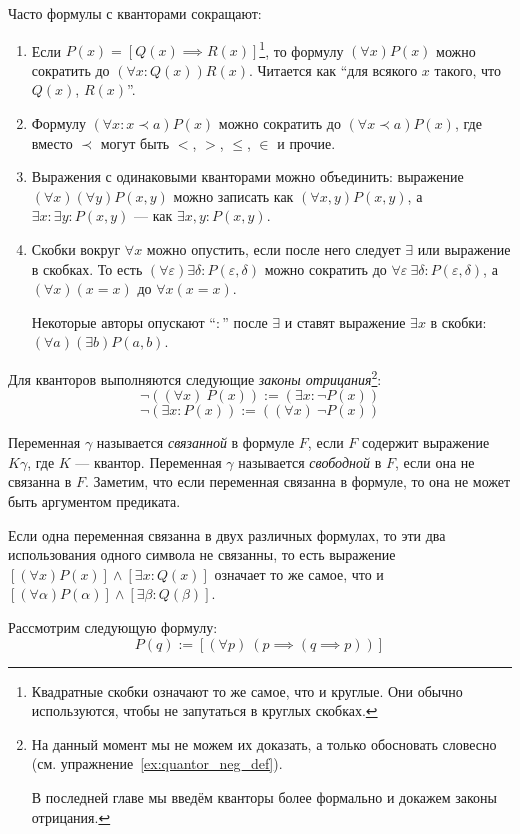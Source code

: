 Часто формулы с кванторами сокращают:
\begin{enumerate}
	\item{}Если ${P(x)=[Q(x)\implies R(x)]}$\footnote{
		Квадратные скобки означают то же самое,
		что и круглые. Они обычно используются, чтобы не запутаться в круглых скобках.},
	то формулу ${(\forall x)P(x)}$ можно сократить
	до ${(\forall x:Q(x))R(x)}$. Читается как ``для всякого $x$ такого, что
	$Q(x)$, $R(x)$''.
	\item{}Формулу $(\forall x:x\prec a)P(x)$ можно сократить до $(\forall x\prec a)P(x)$,
	где вместо $\prec$ могут быть $<$, $>$, $\leq$, $\in$ и прочие.
	\item{}Выражения с одинаковыми кванторами можно объединить:
	выражение $(\forall x)(\forall y)P(x,y)$ можно записать как $(\forall x,y)P(x,y)$,
	а $\exists x:\exists y:P(x,y)$ --- как $\exists x,y:P(x,y)$.
	\item{}Скобки вокруг $\forall x$ можно опустить, если после него следует $\exists$ или
	выражение в скобках.
	То есть ${(\forall \varepsilon)\exists \delta:P(\varepsilon,\delta)}$
	можно сократить до $\forall \varepsilon~\exists \delta:P(\varepsilon,\delta)$,
	а $(\forall x)(x=x)$ до $\forall x(x=x)$.

	Некоторые авторы опускают ``$:$'' после $\exists$ и ставят выражение $\exists x$ в
	скобки: $(\forall a)(\exists b)P(a,b)$.
\end{enumerate}

Для кванторов выполняются следующие {\it законы отрицания}\footnote{
	На данный момент мы не можем их доказать, а только
	обосновать словесно (см. упражнение~\ref{ex:quantor_neg_def}).

	В последней главе мы введём кванторы более формально и докажем законы отрицания.}:
\[
	\lnot((\forall x)~P(x)):=(\exists x:\lnot P(x))
\]
\[
	\lnot(\exists x:P(x)):=((\forall x)~\lnot P(x))
\]

Переменная $\gamma$ называется {\it связанной} в формуле $F$, если $F$
содержит выражение $K\gamma$, где $K$ --- квантор.
Переменная $\gamma$ называется {\it свободной} в $F$, если она не связанна в $F$.
Заметим, что если переменная связанна в формуле, то она не может быть
аргументом предиката.

Если одна переменная связанна в двух различных формулах,
то эти два использования одного символа не связанны, то есть
выражение ${[(\forall x)P(x)]\land[\exists x:Q(x)]}$ означает то же самое, что
и $[(\forall \alpha)P(\alpha)]\land[\exists \beta:Q(\beta)]$.

Рассмотрим следующую формулу:
\[
	P(q):=[(\forall p)~(p\implies (q\implies p))]
\]

